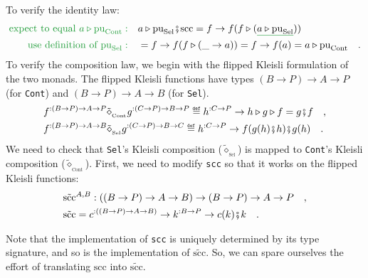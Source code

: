 To verify the identity law:
\begin{align*}
{\color{greenunder}\text{expect to equal }a\triangleright\text{pu}_{\text{Cont}}:}\quad & a\triangleright\text{pu}_{\text{Sel}}\bef\text{scc}=f\rightarrow f(f\triangleright(\gunderline{a\triangleright\text{pu}_{\text{Sel}}}))\\
{\color{greenunder}\text{use definition of }\text{pu}_{\text{Sel}}:}\quad & =f\rightarrow f(f\triangleright(\_\rightarrow a))=f\rightarrow f(a)=a\triangleright\text{pu}_{\text{Cont}}\quad.
\end{align*}
To verify the composition law, we begin with the flipped Kleisli formulation
of the two monads. The flipped Kleisli functions have types $\left(B\rightarrow P\right)\rightarrow A\rightarrow P$
(for \lstinline!Cont!) and $\left(B\rightarrow P\right)\rightarrow A\rightarrow B$
(for \lstinline!Sel!).
\begin{align*}
 & f^{:\left(B\rightarrow P\right)\rightarrow A\rightarrow P}\tilde{\diamond}_{_{\text{Cont}}}g^{:\left(C\rightarrow P\right)\rightarrow B\rightarrow P}\triangleq h^{:C\rightarrow P}\rightarrow h\triangleright g\triangleright f=g\bef f\quad,\\
 & f^{:\left(B\rightarrow P\right)\rightarrow A\rightarrow B}\tilde{\diamond}_{_{\text{Sel}}}g^{:\left(C\rightarrow P\right)\rightarrow B\rightarrow C}\triangleq h^{:C\rightarrow P}\rightarrow f(g(h)\bef h)\bef g(h)\quad.
\end{align*}
We need to check that \lstinline!Sel!\textsf{'}s Kleisli composition ($\tilde{\diamond}_{_{\text{Sel}}}$)
is mapped to \lstinline!Cont!\textsf{'}s Kleisli composition ($\tilde{\diamond}_{_{\text{Cont}}}$).
First, we need to modify \lstinline!scc! so that it works on the
flipped Kleisli functions:
\begin{align*}
 & \tilde{\text{scc}}^{A,B}:\left(\left(B\rightarrow P\right)\rightarrow A\rightarrow B\right)\rightarrow\left(B\rightarrow P\right)\rightarrow A\rightarrow P\quad,\\
 & \tilde{\text{scc}}=c^{:\left(\left(B\rightarrow P\right)\rightarrow A\rightarrow B\right)}\rightarrow k^{:B\rightarrow P}\rightarrow c(k)\bef k\quad.
\end{align*}

Note that the implementation of \lstinline!scc! is uniquely determined
by its type signature, and so is the implementation of $\tilde{\text{scc}}$.
So, we can spare ourselves the effort of translating $\text{scc}$
into $\tilde{\text{scc}}$.

